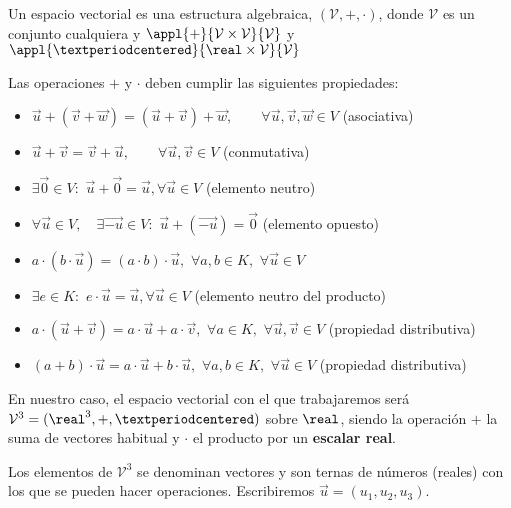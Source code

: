 \begin{defn}
Un espacio vectorial es una estructura algebraica, $(\mathcal{V},+,·)$, donde $\mathcal{V}$ es un conjunto cualquiera y $\appl{+}{\mathcal{V}\times \mathcal{V}}{\mathcal{V}}$ y $\appl{·}{\real\times \mathcal{V}}{\mathcal{V}}$

Las operaciones $+$ y $·$ deben cumplir las siguientes propiedades:
\begin{itemize}
    \item $\vec{u} + (\vec{v} + \vec{w}) = (\vec{u} + \vec{v}) + \vec{w}, \qquad \forall \vec{u}, \vec{v}, \vec{w} \in V $  (asociativa)
    \item $\vec{u} + \vec{v} = \vec{v} + \vec{u}, \qquad \forall \vec{u}, \vec{v} \in V$ (conmutativa)
\item $ \exists{}\vec{0} \in{} V : $  $ \vec{u} + \vec{0} = \vec{u} , \forall{} \vec{u} \in{} V
$ (elemento neutro)

\item $
   \forall{} \vec{u} \in{} V , \quad
   \exists{} \vec{-u} \in{} V : $  $
    \vec{u} + (\vec{-u}) = \vec{0}
$ (elemento opuesto)

\item $
   \mathit{a} \cdot (\mathit{b} \cdot \vec{u})=(\mathit{a} \cdot \mathit{b}) \cdot \vec{u} ,$  $
   \forall{} \mathit{a} ,\mathit{b} \in{}K , $  $
   \forall{} \vec{u} \in{} V
$

\item$
   \exists{e} \in{K}: $  $
   e \cdot \vec{u}   = \vec{u} , 
   \forall{} \vec{u} \in{} V
$ (elemento neutro del producto)
\item $
   \mathit{a} \cdot (\vec{u}+ \vec{v}) =
   \mathit{a} \cdot \vec{u}+ \mathit{a} \cdot \vec{v} , $  $
   \forall{} \mathit{a}\in{}K , $  $
   \forall{} \vec{u}, \vec{v} \in{} V
$ (propiedad distributiva)
\item $
   (\mathit{a} + \mathit{b}) \cdot \vec{u} =
   \mathit{a} \cdot \vec{u} + \mathit{b} \cdot \vec{u} , $  $
   \forall{} \mathit{a}, \mathit{b} \in{} K , $  $
   \forall{} \vec{u} \in{} V
$ (propiedad distributiva)
\end{itemize}

\end{defn}

En nuestro caso, el espacio vectorial con el que trabajaremos será $\mathcal{V}^3 = (\real^3, + , ·)$ sobre $\real$, siendo la operación $+$ la suma de vectores habitual y $·$ el producto por un \textbf{escalar real}.

Los elementos de $\mathcal{V}^3$ se denominan vectores y son ternas de números (reales) con los que se pueden hacer operaciones. 
%
Escribiremos $\vec{u} = (u_1,u_2,u_3)$.



